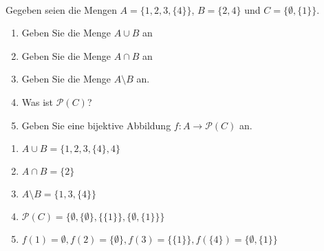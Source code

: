 \newcommand{\printpraesenzlsg}{false}
\newcommand{\printloesungen}{true}
\newcommand{\printbewertungen}{false}
\newcommand{\blattnummer}{1}




\iforiginal{}
\\
Gegeben seien die Mengen $A=\{1,2,3,\{4\}\}$, $B=\{2,4\}$ und $C=\{\emptyset,\{1\}\}$.
\begin{enumerate}
\item Geben Sie die Menge $A\cup B$ an
\item Geben Sie die Menge $A\cap B$ an
\item Geben Sie die Menge $A\setminus B$ an.
\item Was ist $\mathscr{P}(C)$?
\item Geben Sie eine bijektive Abbildung $f:A\to\mathscr{P}(C)$ an.

\end{enumerate}

\begin{loesung}
\begin{enumerate}
\item $A\cup B=\{1,2,3,\{4\},4\}$
\item $A\cap B=\{2\}$
\item $A\setminus B=\{1,3,\{4\}\}$
\item $\mathscr{P}(C)=\{\emptyset,\{\emptyset\},\{\{1\}\},\{\emptyset,\{1\}\}\}$
\item $f(1)=\emptyset, f(2)=\{\emptyset\}, f(3)=\{\{1\}\}, f(\{4\})=\{\emptyset,\{1\}\}$
\end{enumerate}
\end{loesung}

